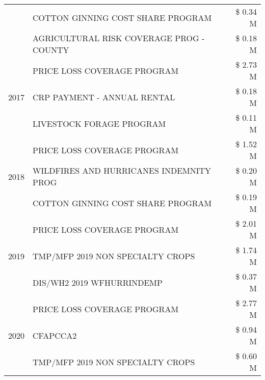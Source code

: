 \begin{tabular}{llr}
 & COTTON GINNING COST SHARE PROGRAM             & \$ 0.34 M \\
 & AGRICULTURAL RISK COVERAGE PROG - COUNTY      & \$ 0.18 M \\
\cline{1-3}
\multirow[t]{3}{*}{2017} & PRICE LOSS COVERAGE PROGRAM & \$ 2.73 M \\
 & CRP PAYMENT - ANNUAL RENTAL & \$ 0.18 M \\
 & LIVESTOCK FORAGE PROGRAM & \$ 0.11 M \\
\cline{1-3}
\multirow[t]{3}{*}{2018} & PRICE LOSS COVERAGE PROGRAM & \$ 1.52 M \\
 & WILDFIRES AND HURRICANES INDEMNITY PROG & \$ 0.20 M \\
 & COTTON GINNING COST SHARE PROGRAM & \$ 0.19 M \\
\cline{1-3}
\multirow[t]{3}{*}{2019} & PRICE LOSS COVERAGE PROGRAM & \$ 2.01 M \\
 & TMP/MFP 2019 NON SPECIALTY CROPS & \$ 1.74 M \\
 & DIS/WH2 2019 WFHURRINDEMP & \$ 0.37 M \\
\cline{1-3}
\multirow[t]{3}{*}{2020} & PRICE LOSS COVERAGE PROGRAM & \$ 2.77 M \\
 & CFAPCCA2 & \$ 0.94 M \\
 & TMP/MFP 2019 NON SPECIALTY CROPS & \$ 0.60 M \\
\cline{1-3}
\bottomrule
\end{tabular}
